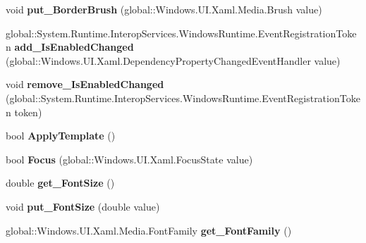 \begin{DoxyCompactItemize}
void {\bfseries put\+\_\+\+Border\+Brush} (global\+::\+Windows.\+U\+I.\+Xaml.\+Media.\+Brush value)
\item 
\mbox{\label{interface_windows_1_1_u_i_1_1_xaml_1_1_controls_1_1_i_control_a37411d40405261227231f8142b22f8e0}} 
global\+::\+System.\+Runtime.\+Interop\+Services.\+Windows\+Runtime.\+Event\+Registration\+Token {\bfseries add\+\_\+\+Is\+Enabled\+Changed} (global\+::\+Windows.\+U\+I.\+Xaml.\+Dependency\+Property\+Changed\+Event\+Handler value)
\item 
\mbox{\label{interface_windows_1_1_u_i_1_1_xaml_1_1_controls_1_1_i_control_a9536f630fb699b5e3696f745e6f1fd92}} 
void {\bfseries remove\+\_\+\+Is\+Enabled\+Changed} (global\+::\+System.\+Runtime.\+Interop\+Services.\+Windows\+Runtime.\+Event\+Registration\+Token token)
\item 
\mbox{\label{interface_windows_1_1_u_i_1_1_xaml_1_1_controls_1_1_i_control_a68feca69bd9c95b33c4636574e86d05d}} 
bool {\bfseries Apply\+Template} ()
\item 
\mbox{\label{interface_windows_1_1_u_i_1_1_xaml_1_1_controls_1_1_i_control_a7c98017d582493146cd685fc022b8bcb}} 
bool {\bfseries Focus} (global\+::\+Windows.\+U\+I.\+Xaml.\+Focus\+State value)
\item 
\mbox{\label{interface_windows_1_1_u_i_1_1_xaml_1_1_controls_1_1_i_control_a9388b2d1fe635f428cae07d67c0a8aaf}} 
double {\bfseries get\+\_\+\+Font\+Size} ()
\item 
\mbox{\label{interface_windows_1_1_u_i_1_1_xaml_1_1_controls_1_1_i_control_a34a055aa84a0508191429e20453c5ce0}} 
void {\bfseries put\+\_\+\+Font\+Size} (double value)
\item 
\mbox{\label{interface_windows_1_1_u_i_1_1_xaml_1_1_controls_1_1_i_control_a689d7b84c03cb8baa86aef968c2f78e5}} 
global\+::\+Windows.\+U\+I.\+Xaml.\+Media.\+Font\+Family {\bfseries get\+\_\+\+Font\+Family} ()

\end{DoxyCompactItemize}
